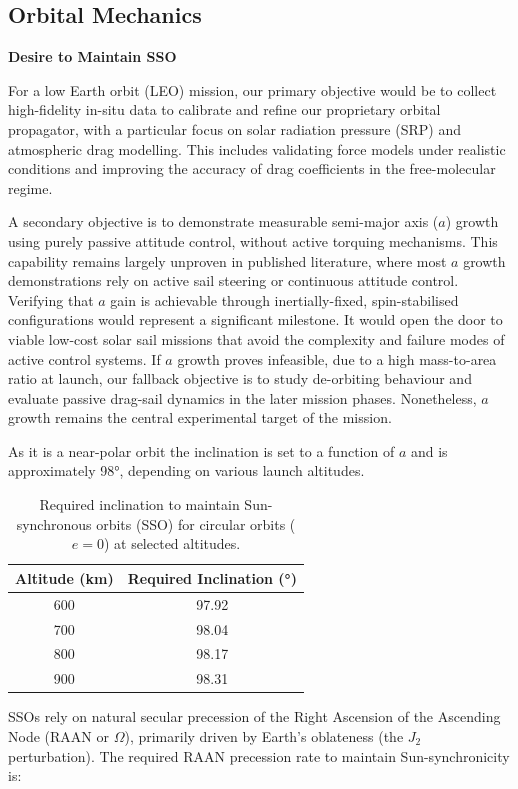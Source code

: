 \documentclass[final,3p,times,twocolumn]{elsarticle}
\begin{document}
\subsection{Orbital Mechanics}\vspace{2pt}
\noindent\textbf{{Desire to Maintain SSO}}
\vspace{5pt}
\par\noindent For a low Earth orbit (LEO) mission, our primary objective would be to collect high-fidelity in-situ data to calibrate and refine our proprietary orbital propagator, with a particular focus on solar radiation pressure (SRP) and atmospheric drag modelling. This includes validating force models under realistic conditions and improving the accuracy of drag coefficients in the free-molecular regime.
\vspace{5pt}
\par\noindent A secondary objective is to demonstrate measurable semi-major axis (\( a \)) growth using purely passive attitude control, without active torquing mechanisms. This capability remains largely unproven in published literature, where most \( a \) growth demonstrations rely on active sail steering or continuous attitude control. Verifying that \( a \) gain is achievable through inertially-fixed, spin-stabilised configurations would represent a significant milestone. It would open the door to viable low-cost solar sail missions that avoid the complexity and failure modes of active control systems. If \( a \) growth proves infeasible, due to a high mass-to-area ratio at launch, our fallback objective is to study de-orbiting behaviour and evaluate passive drag-sail dynamics in the later mission phases. Nonetheless, \( a \) growth remains the central experimental target of the mission.

\vspace{5pt}
\par\noindent As it is a near-polar orbit the inclination is set to a function of \( a \) and is approximately 98°, depending on various launch altitudes.

\begin{table}[htbp]
\centering
\begin{tabular}{c|c}
\textbf{Altitude (km)} & \textbf{Required Inclination (°)} \\
\hline
600 & 97.92 \\
700 & 98.04 \\
800 & 98.17 \\
900 & 98.31 \\
\end{tabular}
\caption{Required inclination to maintain Sun-synchronous orbits (SSO) for circular orbits (\(e = 0\)) at selected altitudes.}
\label{tab:sso_inclinations}
\end{table}
\vspace{5pt}
\par\noindent SSOs rely on natural secular precession of the Right Ascension of the Ascending Node (RAAN or \( \Omega \)), primarily driven by Earth’s oblateness (the \( J_2 \) perturbation). The required RAAN precession rate to maintain Sun-synchronicity is:
\end{document}
